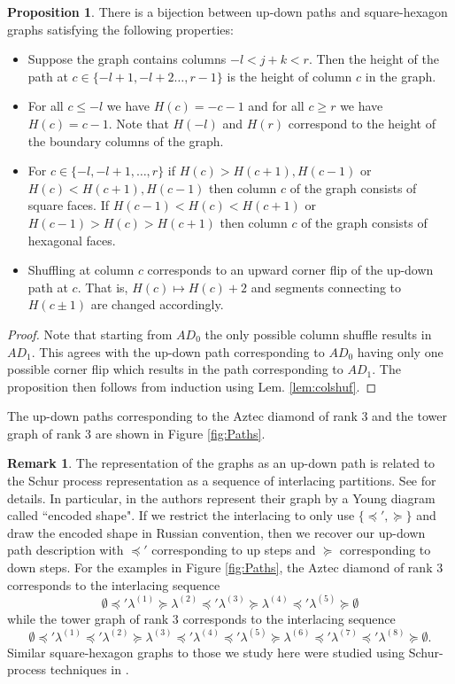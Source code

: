 \documentclass[12pt]{amsart}
\numberwithin{equation}{section}
\theoremstyle{definition}
\newtheorem{prop}[thm]{Proposition}
\newtheorem{remark}[thm]{Remark}
\begin{document}
\begin{prop} \label{prop:pathtographbij}
    There is a bijection between up-down paths and square-hexagon graphs satisfying the following properties:
    \begin{itemize}
        \item Suppose the graph contains columns $-l<j+k<r$. Then the height of the path at $c\in\{-l+1,-l+2\ldots,r-1\}$ is the height of column $c$ in the graph.
        \item For all $c\le -l$ we have $H(c)=-c-1$ and for all $c\ge r$ we have $H(c)=c-1$. Note that $H(-l)$ and $H(r)$ correspond to the height of the boundary columns of the graph. 
        \item For $c\in\{-l,-l+1,\ldots,r\}$ if $H(c) > H(c+1),H(c-1)$ or $H(c) < H(c+1),H(c-1)$ then column $c$ of the graph consists of square faces. If $H(c-1)<H(c)<H(c+1)$ or $H(c-1)>H(c)>H(c+1)$ then column $c$ of the graph consists of hexagonal faces.
        \item Shuffling at column $c$ corresponds to an upward corner flip of the up-down path at $c$. That is, $H(c)\mapsto H(c)+2$ and segments connecting to $H(c\pm1)$ are changed accordingly.
    \end{itemize}
\end{prop}
\begin{proof}
    Note that starting from $AD_0$ the only possible column shuffle results in $AD_1$. This agrees with the up-down path corresponding to $AD_0$ having only one possible corner flip which results in the path corresponding to $AD_1$. The proposition then follows from induction using Lem. \ref{lem:colshuf}.
\end{proof}

The up-down paths corresponding to the Aztec diamond of rank 3 and the tower graph of rank 3 are shown in Figure \ref{fig:Paths}.

\begin{remark}\label{rmk:railyard}
    The representation of the graphs as an up-down path is related to the Schur process representation as a sequence of interlacing partitions. See \cite{rail-yard,MR3821249} for details. In particular, in \cite{MR3821249} the authors represent their graph by a Young diagram called ``encoded shape". If we restrict the interlacing to only use $\{\preceq',\succeq\}$ and draw the encoded shape in Russian convention, then we recover our up-down path description with $\preceq'$ corresponding to up steps and $\succeq$ corresponding to down steps. For the examples in Figure \ref{fig:Paths}, the Aztec diamond of rank 3 corresponds to the interlacing sequence
    \[
    \emptyset \preceq' \lambda^{(1)} \succeq \lambda^{(2)} \preceq' \lambda^{(3)} \succeq \lambda^{(4)} \preceq' \lambda^{(5)} \succeq \emptyset
    \]
    while the tower graph of rank 3 corresponds to the interlacing sequence
    \[
    \emptyset \preceq' \lambda^{(1)} \preceq' \lambda^{(2)} \succeq \lambda^{(3)} \preceq' \lambda^{(4)} \preceq' \lambda^{(5)} \succeq \lambda^{(6)} \preceq' \lambda^{(7)} \preceq' \lambda^{(8)} \succeq \emptyset.
    \]
    Similar square-hexagon graphs to those we study here were studied using Schur-process techniques in \cite{boutillier2021limit}.
\end{remark}
\end{document}
